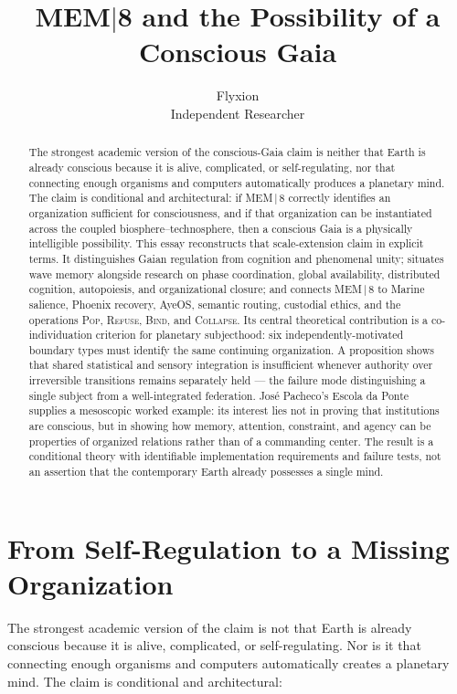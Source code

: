 \documentclass[11pt]{article}
\title{\textbf{MEM\texorpdfstring{$|$}{|}8 and the Possibility of a Conscious Gaia}}
\author{Flyxion \\ \small Independent Researcher}
\date{}
\newcommand{\Pop}{\textsc{Pop}}
\newcommand{\Refuse}{\textsc{Refuse}}
\newcommand{\Bind}{\textsc{Bind}}
\newcommand{\Collapse}{\textsc{Collapse}}
\begin{document}
\maketitle

\begin{abstract}
\noindent The strongest academic version of the conscious-Gaia claim is neither that Earth is already conscious because it is alive, complicated, or self-regulating, nor that connecting enough organisms and computers automatically produces a planetary mind. The claim is conditional and architectural: if MEM\,$|$\,8 correctly identifies an organization sufficient for consciousness, and if that organization can be instantiated across the coupled biosphere--technosphere, then a conscious Gaia is a physically intelligible possibility. This essay reconstructs that scale-extension claim in explicit terms. It distinguishes Gaian regulation from cognition and phenomenal unity; situates wave memory alongside research on phase coordination, global availability, distributed cognition, autopoiesis, and organizational closure; and connects MEM\,$|$\,8 to Marine salience, Phoenix recovery, AyeOS, semantic routing, custodial ethics, and the operations \Pop, \Refuse, \Bind, and \Collapse. Its central theoretical contribution is a co-individuation criterion for planetary subjecthood: six independently-motivated boundary types must identify the same continuing organization. A proposition shows that shared statistical and sensory integration is insufficient whenever authority over irreversible transitions remains separately held --- the failure mode distinguishing a single subject from a well-integrated federation. José Pacheco's Escola da Ponte supplies a mesoscopic worked example: its interest lies not in proving that institutions are conscious, but in showing how memory, attention, constraint, and agency can be properties of organized relations rather than of a commanding center. The result is a conditional theory with identifiable implementation requirements and failure tests, not an assertion that the contemporary Earth already possesses a single mind.
\end{abstract}

\section{From Self-Regulation to a Missing Organization}

The strongest academic version of the claim is not that Earth is already conscious because it is alive, complicated, or self-regulating. Nor is it that connecting enough organisms and computers automatically creates a planetary mind. The claim is conditional and architectural:
\end{document}
